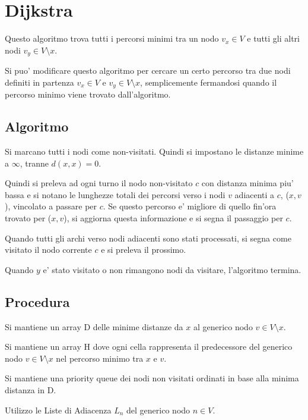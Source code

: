 \chapter{Dijkstra}

Questo algoritmo trova tutti i percorsi minimi tra un nodo $v_x \in V$ e tutti gli altri nodi $v_y \in V \setminus x$.

Si puo' modificare questo algoritmo per cercare un certo percorso tra due nodi definiti in partenza $v_x \in V$ e $v_y \in V \setminus x$, semplicemente fermandosi quando il percorso minimo viene trovato dall'algoritmo.

\section{Algoritmo}

Si marcano tutti i nodi come non-visitati. Quindi si impostano le distanze minime a $\infty$, tranne $d(x, x) = 0$.

Quindi si preleva ad ogni turno il nodo non-visitato $c$ con distanza minima piu' bassa e si notano le lunghezze totali dei percorsi verso i nodi $v$ adiacenti a $c$, ($x, v$), vincolato a passare per $c$. Se questo percorso e' migliore di quello fin'ora trovato per ($x, v$), si aggiorna questa informazione e si segna il passaggio per $c$.

Quando tutti gli archi verso nodi adiacenti sono stati processati, si segna come visitato il nodo corrente $c$ e si preleva il prossimo.

Quando $y$ e' stato visitato o non rimangono nodi da visitare, l'algoritmo termina.

\newpage

\section{Procedura}

Si mantiene un array D delle minime distanze da $x$ al generico nodo $v \in V \setminus x$.

Si mantiene un array H dove ogni cella rappresenta il predecessore del generico nodo $v \in V \setminus x$ nel percorso minimo tra $x$ e $v$.

Si mantiene una priority queue dei nodi non visitati ordinati in base alla minima distanza in D.

Utilizzo le Liste di Adiacenza $L_n$ del generico nodo $n \in V$.

